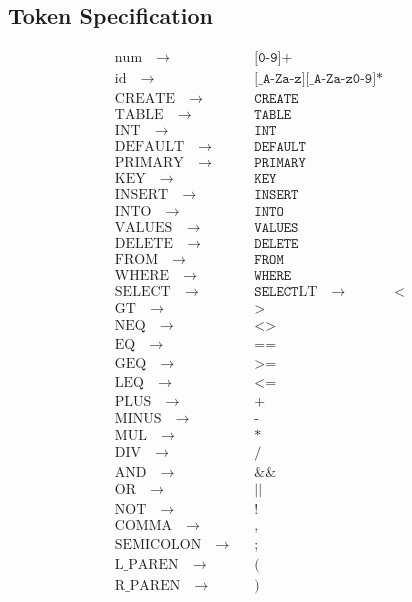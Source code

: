 \documentclass{article}
\begin{document}
\subsection {Token Specification}
\begin{align*}
\text{num}\quad\to\quad & \texttt{[0-9]+} \\
\text{id}\quad\to\quad & \texttt{[\_A-Za-z][\_A-Za-z0-9]*} \\
\text{CREATE}\quad\to\quad & \texttt{CREATE} \\
\text{TABLE}\quad\to\quad & \texttt{TABLE} \\
\text{INT}\quad\to\quad & \texttt{INT} \\
\text{DEFAULT}\quad\to\quad & \texttt{DEFAULT} \\
\text{PRIMARY}\quad\to\quad & \texttt{PRIMARY} \\
\text{KEY}\quad\to\quad & \texttt{KEY} \\
\text{INSERT}\quad\to\quad & \texttt{INSERT} \\
\text{INTO}\quad\to\quad & \texttt{INTO} \\
\text{VALUES}\quad\to\quad & \texttt{VALUES} \\
\text{DELETE}\quad\to\quad & \texttt{DELETE} \\
\text{FROM}\quad\to\quad & \texttt{FROM} \\
\text{WHERE}\quad\to\quad & \texttt{WHERE} \\
\text{SELECT}\quad\to\quad & \texttt{SELECT}
\text{LT}\quad\to\quad & \texttt{<} \\
\text{GT}\quad\to\quad & \texttt{>} \\
\text{NEQ}\quad\to\quad & \texttt{<>} \\
\text{EQ}\quad\to\quad & \texttt{==} \\
\text{GEQ}\quad\to\quad & \texttt{>=} \\
\text{LEQ}\quad\to\quad & \texttt{<=} \\
\text{PLUS}\quad\to\quad & \texttt{+} \\
\text{MINUS}\quad\to\quad & \texttt{-} \\
\text{MUL}\quad\to\quad & \texttt{*} \\
\text{DIV}\quad\to\quad & \texttt{/} \\
\text{AND}\quad\to\quad & \texttt{\&\&} \\
\text{OR}\quad\to\quad & \texttt{||} \\
\text{NOT}\quad\to\quad & \texttt{!} \\
\text{COMMA}\quad\to\quad & \texttt{,} \\
\text{SEMICOLON}\quad\to\quad & \texttt{;} \\
\text{L\_PAREN}\quad\to\quad & \texttt{(} \\
\text{R\_PAREN}\quad\to\quad & \texttt{)}
\end{align*}
\end{document}
